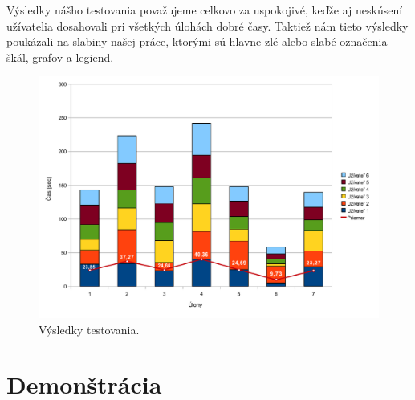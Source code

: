 Výsledky nášho testovania považujeme celkovo za uspokojivé, keďže aj neskúsení užívatelia dosahovali pri všetkých úlohách dobré časy. Taktiež nám tieto výsledky poukázali na slabiny našej práce, ktorými sú hlavne zlé alebo slabé označenia škál, grafov a legiend.

\begin{figure}
	\centering
	\includegraphics[width = 5in]{resultchart}
	\caption{Výsledky testovania.}
	\label{fig:results} 
\end{figure}

\section{Demonštrácia}
